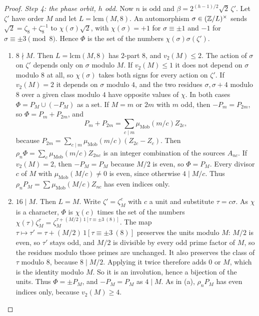 \documentclass[11pt]{article}
\begin{document}
\begin{proof}
\emph{Step 4: the phase orbit, $h$ odd.} Now $n$ is odd and $\beta=2^{(h-1)/2}\sqrt2\,\zeta'$. Let $\zeta'$ have order $M$ and let $L=\mathrm{lcm}(M,8)$. An automorphism $\sigma\in(\mathbb Z/L)^\times$ sends $\sqrt2=\zeta_8+\zeta_8^{-1}$ to $\chi(\sigma)\sqrt2$, with $\chi(\sigma)=+1$ for $\sigma\equiv\pm1$ and $-1$ for $\sigma\equiv\pm3\pmod 8$. Hence $\Phi$ is the set of the numbers $\chi(\sigma)\sigma(\zeta')$.
\begin{enumerate}[label=(\alph*),leftmargin=*]
\item \emph{$8\nmid M$.} Then $L=\mathrm{lcm}(M,8)$ has $2$-part $8$, and $v_2(M)\le2$. The action of $\sigma$ on $\zeta'$ depends only on $\sigma$ modulo $M$. If $v_2(M)\le1$ it does not depend on $\sigma$ modulo $8$ at all, so $\chi(\sigma)$ takes both signs for every action on $\zeta'$. If $v_2(M)=2$ it depends on $\sigma$ modulo $4$, and the two residues $\sigma,\sigma+4$ modulo $8$ over a given class modulo $4$ have opposite values of $\chi$. In both cases $\Phi=P_M\cup(-P_M)$ as a set. If $M=m$ or $2m$ with $m$ odd, then $-P_m=P_{2m}$, so $\Phi=P_m+P_{2m}$, and
\[
 P_m+P_{2m}=\sum_{c\mid m}\mu_{\mathrm{Mob}}(m/c)Z_{2c},
\]
because $P_{2m}=\sum_{c\mid m}\mu_{\mathrm{Mob}}(m/c)(Z_{2c}-Z_c)$. Then $\rho_n\Phi=\sum_c\mu_{\mathrm{Mob}}(m/c)Z_{2nc}$ is an integer combination of the sources $A_{nc}$. If $v_2(M)=2$, then $-P_M=P_M$ because $M/2$ is even, so $\Phi=P_M$. Every divisor $c$ of $M$ with $\mu_{\mathrm{Mob}}(M/c)\ne0$ is even, since otherwise $4\mid M/c$. Thus $\rho_nP_M=\sum\mu_{\mathrm{Mob}}(M/c)Z_{nc}$ has even indices only.
\item \emph{$16\mid M$.} Then $L=M$. Write $\zeta'=\zeta_M^c$ with $c$ a unit and substitute $\tau=c\sigma$. As $\chi$ is a character, $\Phi$ is $\chi(c)$ times the set of the numbers $\chi(\tau)\zeta_M^{\tau}=\zeta_M^{\tau+(M/2)\,1[\tau\equiv\pm3\ (8)]}$. The map $\tau\mapsto\tau'=\tau+(M/2)\,1[\tau\equiv\pm3\ (8)]$ preserves the units modulo $M$: $M/2$ is even, so $\tau'$ stays odd, and $M/2$ is divisible by every odd prime factor of $M$, so the residues modulo those primes are unchanged. It also preserves the class of $\tau$ modulo $8$, because $8\mid M/2$. Applying it twice therefore adds $0$ or $M$, which is the identity modulo $M$. So it is an involution, hence a bijection of the units. Thus $\Phi=\pm P_M$, and $-P_M=P_M$ as $4\mid M$. As in (a), $\rho_nP_M$ has even indices only, because $v_2(M)\ge4$.

\end{enumerate}
\end{proof}
\end{document}
